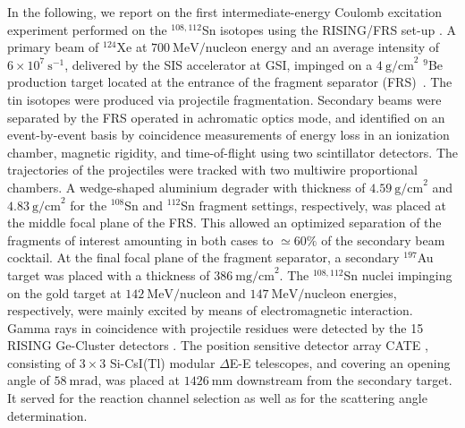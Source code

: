 \documentclass[prc,twocolumn,amssymb,amsmath,showpacs,superscriptaddress]{revtex4}
\begin{document}
In the following, we report on the first intermediate-energy
Coulomb excitation experiment performed on the $^{108,112}$Sn
isotopes using the RISING/FRS set-up \cite{wol05}. A primary beam
of $^{124}$Xe at $700\ \text{MeV/nucleon}$ energy and an average
intensity of $6 \times 10^{7}\ \text{s}^{-1}$, delivered by the
SIS accelerator at GSI, impinged on a $4\ \text{g/cm}^{2}$ $^9$Be
production target located at the entrance of the fragment
separator (FRS)~\cite{gei92}. The tin isotopes were produced via
projectile fragmentation. Secondary beams were separated by the
FRS operated in achromatic optics mode, and identified on an
event-by-event basis by coincidence measurements of energy loss in
an ionization chamber, magnetic rigidity, and time-of-flight using
two scintillator detectors. The trajectories of the projectiles
were tracked with two multiwire proportional chambers. A
wedge-shaped aluminium degrader with thickness of $4.59\
\text{g/cm}^{2}$ and $4.83\ \text{g/cm}^{2}$ for the $^{108}$Sn
and $^{112}$Sn fragment settings, respectively, was placed at the
middle focal plane of the FRS. This allowed an optimized
separation of the fragments of interest amounting in both cases to
$\simeq 60 \%$ of the secondary beam cocktail. At the final focal
plane of the fragment separator, a secondary $^{197}$Au target was
placed with a thickness of $386\ \text{mg/cm}^{2}$. The
$^{108,112}$Sn nuclei impinging on the gold target at $142\
\text{MeV/nucleon}$ and $147\ \text{MeV/nucleon}$ energies,
respectively, were mainly excited by means of electromagnetic
interaction. Gamma rays in coincidence with projectile residues
were detected by the 15 RISING Ge-Cluster detectors
\cite{sim97,wol05}. The position sensitive detector array CATE
\cite{loz05}, consisting of $3 \times 3$ Si-CsI(Tl) modular
$\Delta$E-E telescopes, and covering an opening angle of $58\
\text{mrad}$, was placed at $1426\ \text{mm}$ downstream from the
secondary target. It served for the reaction channel selection as
well as for the scattering angle determination.
\end{document}
